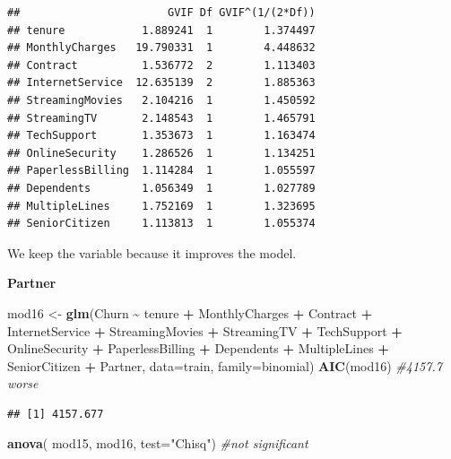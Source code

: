 \documentclass[
  twoside]{article}
\newenvironment{Shaded}{\begin{snugshade}}{\end{snugshade}}
\newcommand{\AttributeTok}[1]{\textcolor[rgb]{0.13,0.29,0.53}{#1}}
\newcommand{\CommentTok}[1]{\textcolor[rgb]{0.56,0.35,0.01}{\textit{#1}}}
\newcommand{\FunctionTok}[1]{\textcolor[rgb]{0.13,0.29,0.53}{\textbf{#1}}}
\newcommand{\NormalTok}[1]{#1}
\newcommand{\OtherTok}[1]{\textcolor[rgb]{0.56,0.35,0.01}{#1}}
\newcommand{\SpecialCharTok}[1]{\textcolor[rgb]{0.81,0.36,0.00}{\textbf{#1}}}
\newcommand{\StringTok}[1]{\textcolor[rgb]{0.31,0.60,0.02}{#1}}
\begin{document}
\begin{verbatim}
##                       GVIF Df GVIF^(1/(2*Df))
## tenure            1.889241  1        1.374497
## MonthlyCharges   19.790331  1        4.448632
## Contract          1.536772  2        1.113403
## InternetService  12.635139  2        1.885363
## StreamingMovies   2.104216  1        1.450592
## StreamingTV       2.148543  1        1.465791
## TechSupport       1.353673  1        1.163474
## OnlineSecurity    1.286526  1        1.134251
## PaperlessBilling  1.114284  1        1.055597
## Dependents        1.056349  1        1.027789
## MultipleLines     1.752169  1        1.323695
## SeniorCitizen     1.113813  1        1.055374
\end{verbatim}

We keep the variable because it improves the model.

\textbf{Partner}

\begin{Shaded}
\begin{Highlighting}[]
\NormalTok{mod16 }\OtherTok{\textless{}{-}} \FunctionTok{glm}\NormalTok{(Churn }\SpecialCharTok{\textasciitilde{}}\NormalTok{ tenure }\SpecialCharTok{+}\NormalTok{ MonthlyCharges }\SpecialCharTok{+}\NormalTok{ Contract }\SpecialCharTok{+}\NormalTok{ InternetService }\SpecialCharTok{+} 
\NormalTok{               StreamingMovies }\SpecialCharTok{+}\NormalTok{ StreamingTV }\SpecialCharTok{+}\NormalTok{ TechSupport }\SpecialCharTok{+}\NormalTok{ OnlineSecurity }\SpecialCharTok{+} 
\NormalTok{               PaperlessBilling }\SpecialCharTok{+}\NormalTok{ Dependents }\SpecialCharTok{+}\NormalTok{ MultipleLines }\SpecialCharTok{+}\NormalTok{ SeniorCitizen }\SpecialCharTok{+} 
\NormalTok{               Partner, }\AttributeTok{data=}\NormalTok{train, }\AttributeTok{family=}\NormalTok{binomial)}
\FunctionTok{AIC}\NormalTok{(mod16) }\CommentTok{\#4157.7 worse}
\end{Highlighting}
\end{Shaded}

\begin{verbatim}
## [1] 4157.677
\end{verbatim}

\begin{Shaded}
\begin{Highlighting}[]
\FunctionTok{anova}\NormalTok{( mod15, mod16,  }\AttributeTok{test=}\StringTok{"Chisq"}\NormalTok{) }\CommentTok{\#not significant}
\end{Highlighting}
\end{Shaded}
\end{document}
